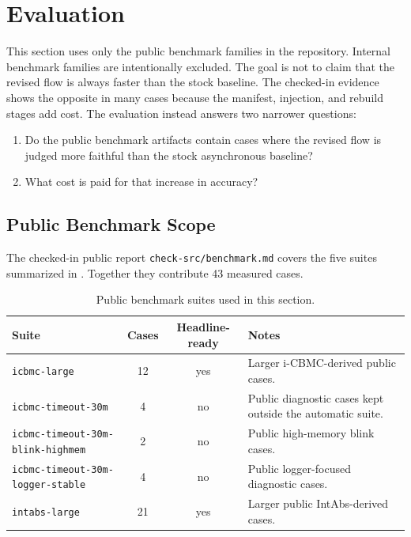 \section{Evaluation}
\label{sec:evaluation}

This section uses only the public benchmark families in the repository. Internal benchmark
families are intentionally excluded. The goal is not
to claim that the revised flow is always faster than the stock baseline. The checked-in
evidence shows the opposite in many cases because the manifest, injection, and rebuild stages
add cost. The evaluation instead answers two narrower questions:

\begin{enumerate}[leftmargin=1.5em]
  \item Do the public benchmark artifacts contain cases where the revised flow is judged more
  faithful than the stock asynchronous baseline?
  \item What cost is paid for that increase in accuracy?
\end{enumerate}

\subsection{Public Benchmark Scope}

The checked-in public report \texttt{check-src/benchmark.md} covers the five suites summarized
in . Together they contribute 43 measured cases.

\begin{table}[t]
  \centering
  \small
  \begin{tabularx}{\linewidth}{@{}l c c X@{}}
    \toprule
    Suite & Cases & Headline-ready & Notes \\
    \midrule
    \texttt{icbmc-large} & 12 & yes & Larger i-CBMC-derived public cases. \\
    \texttt{icbmc-timeout-30m} & 4 & no & Public diagnostic cases kept outside the automatic
    suite. \\
    \texttt{icbmc-timeout-30m-blink-highmem} & 2 & no & Public high-memory blink cases. \\
    \texttt{icbmc-timeout-30m-logger-stable} & 4 & no & Public logger-focused diagnostic
    cases. \\
    \texttt{intabs-large} & 21 & yes & Larger public IntAbs-derived cases. \\
    \bottomrule
  \end{tabularx}
  \caption{Public benchmark suites used in this section.}
  \label{tab:public-suites}
\end{table}

